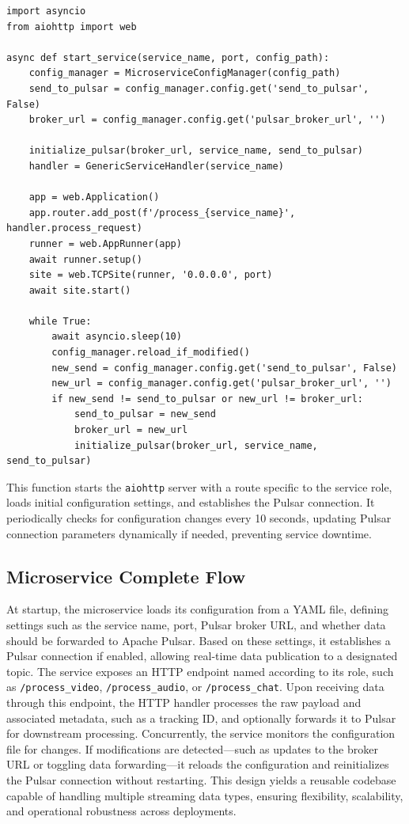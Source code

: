 \begin{lstlisting}[breaklines=true,basicstyle=\small\ttfamily,frame=single]
import asyncio
from aiohttp import web

async def start_service(service_name, port, config_path):
    config_manager = MicroserviceConfigManager(config_path)
    send_to_pulsar = config_manager.config.get('send_to_pulsar', False)
    broker_url = config_manager.config.get('pulsar_broker_url', '')

    initialize_pulsar(broker_url, service_name, send_to_pulsar)
    handler = GenericServiceHandler(service_name)

    app = web.Application()
    app.router.add_post(f'/process_{service_name}', handler.process_request)
    runner = web.AppRunner(app)
    await runner.setup()
    site = web.TCPSite(runner, '0.0.0.0', port)
    await site.start()

    while True:
        await asyncio.sleep(10)
        config_manager.reload_if_modified()
        new_send = config_manager.config.get('send_to_pulsar', False)
        new_url = config_manager.config.get('pulsar_broker_url', '')
        if new_send != send_to_pulsar or new_url != broker_url:
            send_to_pulsar = new_send
            broker_url = new_url
            initialize_pulsar(broker_url, service_name, send_to_pulsar)
\end{lstlisting}

This function starts the \texttt{aiohttp} server with a route specific to the service role, loads initial configuration settings, and establishes the Pulsar connection. It periodically checks for configuration changes every 10 seconds, updating Pulsar connection parameters dynamically if needed, preventing service downtime.

\subsection{Microservice Complete Flow}
At startup, the microservice loads its configuration from a YAML file, defining settings such as the service name, port, Pulsar broker URL, and whether data should be forwarded to Apache Pulsar. Based on these settings, it establishes a Pulsar connection if enabled, allowing real-time data publication to a designated topic. The service exposes an HTTP endpoint named according to its role, such as \texttt{/process\_video}, \texttt{/process\_audio}, or \texttt{/process\_chat}. Upon receiving data through this endpoint, the HTTP handler processes the raw payload and associated metadata, such as a tracking ID, and optionally forwards it to Pulsar for downstream processing. Concurrently, the service monitors the configuration file for changes. If modifications are detected—such as updates to the broker URL or toggling data forwarding—it reloads the configuration and reinitializes the Pulsar connection without restarting. This design yields a reusable codebase capable of handling multiple streaming data types, ensuring flexibility, scalability, and operational robustness across deployments.




